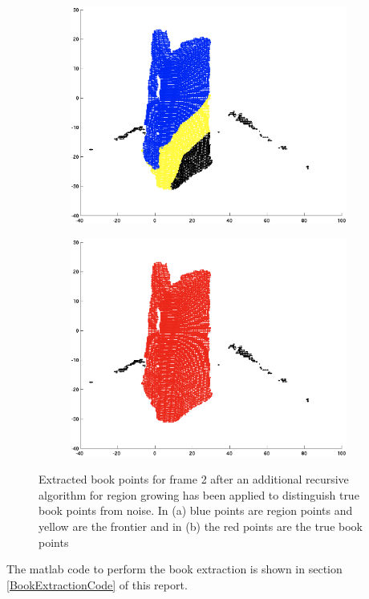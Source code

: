 \begin{figure}[H]
	\centering
	\begin{subfigure}[b]{0.45\textwidth}
		\centering
		\includegraphics[width=\textwidth]{Images/cleaningIteration(1).png}
		\subcaption{}
		\label{fig:cleaningIteration}
	\end{subfigure}%
	\hspace{1cm}
	\begin{subfigure}[b]{0.45\textwidth}
		\centering
		\includegraphics[width=\textwidth]{Images/6-RegionGrowingCleaning(1).png}
		\subcaption{}
		\label{fig:bookPointsFrame2Cleaned}
	\end{subfigure}
	\caption{Extracted book points for frame 2 after an additional recursive algorithm for region growing has been applied to distinguish true book points from noise. In (a) blue points are region points and yellow are the frontier and in (b) the red points are the true book points}
\end{figure}

The matlab code to perform the book extraction is shown in section \ref{BookExtractionCode} of this report.